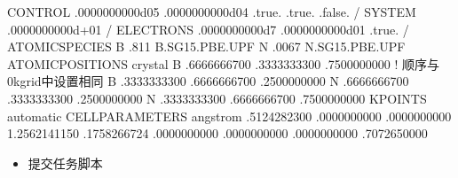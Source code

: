 \documentclass[a4paper,12pt,english]{sphinxmanual}
\begin{document}
\begin{sphinxVerbatim}[commandchars=\\\{\}]
  CONTROL
    
      .0000000000d\PYGZhy{}05
      .0000000000d\PYGZhy{}04
    
    
    
    
    .true.
    .true.
    
    .false.
/
SYSTEM
      .0000000000d+01
    
    
    
/
ELECTRONS
      .0000000000d\PYGZhy{}7
    
      .0000000000d\PYGZhy{}01
    
    
    
    .true.
/
ATOMIC\PYGZus{}SPECIES
B      .811 B.SG15.PBE.UPF
N      .0067 N.SG15.PBE.UPF
ATOMIC\PYGZus{}POSITIONS crystal
B            .6666666700       .3333333300       .7500000000  ! 顺序与0\PYGZhy{}kgrid中设置相同
B            .3333333300       .6666666700       .2500000000
N            .6666666700       .3333333300       .2500000000
N            .3333333300       .6666666700       .7500000000
K\PYGZus{}POINTS automatic
     
CELL\PYGZus{}PARAMETERS angstrom
      .5124282300       .0000000000       .0000000000
     \PYGZhy{}1.2562141150       .1758266724       .0000000000
      .0000000000       .0000000000       .7072650000
\end{sphinxVerbatim}
\begin{itemize}
\item {} 
\sphinxAtStartPar
提交任务脚本

\end{itemize}
\end{document}

